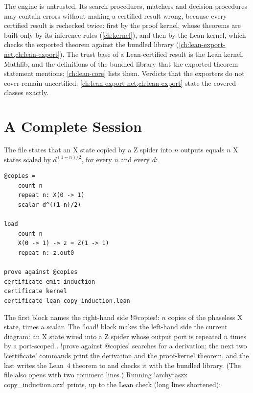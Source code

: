 The engine is untrusted. Its search procedures, matchers and decision procedures may contain errors without making a certified result wrong, because every certified result is rechecked twice: first by the proof kernel, whose theorems are built only by its inference rules (\cref{ch:kernel}), and then by the Lean kernel, which checks the exported theorem against the bundled library (\cref{ch:lean-export-net,ch:lean-export}). The trust base of a Lean-certified result is the Lean kernel, Mathlib, and the definitions of the bundled library that the exported theorem statement mentions; \cref{ch:lean-core} lists them. Verdicts that the exporters do not cover remain uncertified; \cref{ch:lean-export-net,ch:lean-export} state the covered classes exactly.

\section{A Complete Session}\label{sec:overview-session}

The file  states that an X state copied by a Z spider into $n$ outputs equals $n$ X states scaled by $d^{(1-n)/2}$, for every $n$ and every $d$:

\begin{lstlisting}[style=azx]
@copies =
    count n
    repeat n: X(0 -> 1)
    scalar d^((1-n)/2)

load
    count n
    X(0 -> 1) -> z = Z(1 -> 1)
    repeat n: z.out0

prove against @copies
certificate emit induction
certificate kernel
certificate lean copy_induction.lean
\end{lstlisting}

The first block names the right-hand side \azx!@copies!: $n$ copies of the phaseless X state, times a scalar. The \azx!load! block makes the left-hand side the current diagram: an X state wired into a Z spider whose output port is repeated $n$ times by a port-scoped \bbox{}. \azx!prove against @copies! searches for a derivation; the next two \azx!certificate! commands print the derivation and the proof-kernel theorem, and the last writes the Lean~4 theorem to  and checks it with the bundled library. (The file also opens with two comment lines.) Running \code!archytaszx copy_induction.azx! prints, up to the Lean check (long lines shortened):


